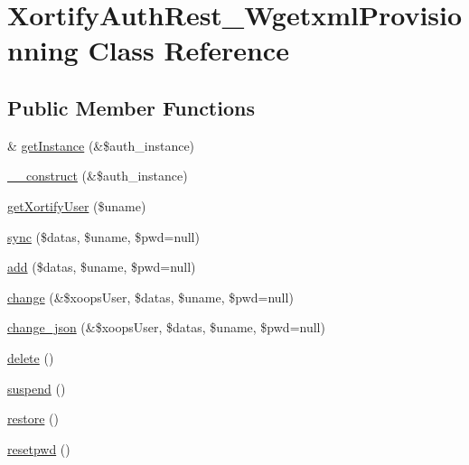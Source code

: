 \hypertarget{class_xortify_auth_rest___wgetxml_provisionning}{\section{Xortify\-Auth\-Rest\-\_\-\-Wgetxml\-Provisionning Class Reference}
\label{class_xortify_auth_rest___wgetxml_provisionning}
}
\subsection*{Public Member Functions}
\begin{DoxyCompactItemize}
\item 
\& \hyperlink{class_xortify_auth_rest___wgetxml_provisionning_a2c8eaa915c70d75289ac8a03686194f9}{get\-Instance} (\&\$auth\-\_\-instance)
\item 
\hyperlink{class_xortify_auth_rest___wgetxml_provisionning_a0f25832dc86774e7605b81fe57b083c2}{\-\_\-\-\_\-construct} (\&\$auth\-\_\-instance)
\item 
\hyperlink{class_xortify_auth_rest___wgetxml_provisionning_a041d726ac26672547ed1504e8e0117aa}{get\-Xortify\-User} (\$uname)
\item 
\hyperlink{class_xortify_auth_rest___wgetxml_provisionning_a35dc08b0f2138eb818ff95345b73bcff}{sync} (\$datas, \$uname, \$pwd=null)
\item 
\hyperlink{class_xortify_auth_rest___wgetxml_provisionning_adfc9fcef01e7bd7b2f47e8e79d51fc63}{add} (\$datas, \$uname, \$pwd=null)
\item 
\hyperlink{class_xortify_auth_rest___wgetxml_provisionning_ae1f0971b9712c794620cf309164e43af}{change} (\&\$xoops\-User, \$datas, \$uname, \$pwd=null)
\item 
\hyperlink{class_xortify_auth_rest___wgetxml_provisionning_a94f4e0408f26e65abca347ec883f4ec9}{change\-\_\-json} (\&\$xoops\-User, \$datas, \$uname, \$pwd=null)
\item 
\hyperlink{class_xortify_auth_rest___wgetxml_provisionning_a13bdffdd926f26b825ea57066334ff01}{delete} ()
\item 
\hyperlink{class_xortify_auth_rest___wgetxml_provisionning_ad73006a505121228f3b075c2409787d2}{suspend} ()
\item 
\hyperlink{class_xortify_auth_rest___wgetxml_provisionning_aa1371f22826cf8cde4454c9b467203d0}{restore} ()
\item 
\hyperlink{class_xortify_auth_rest___wgetxml_provisionning_a06d70fbd3a2db390b6f2530c0076628e}{resetpwd} ()
\end{DoxyCompactItemize}
